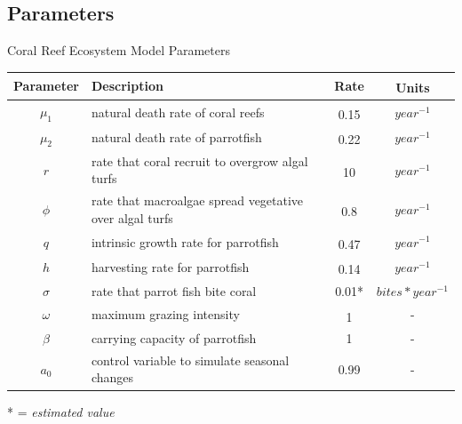 \documentclass{beamer}
\begin{document}
\subsection{Parameters}
\begin{frame}{Coral Reef Ecosystem Model Parameters}
\hspace{-7cm}
    \begin{table}
    \vspace{-1cm}
    \begin{tabular}{c p{5cm} c c}
        \hline
        Parameter & Description & Rate & Units\textsuperscript{\cite{12_noaa_report}\cite{04_mathanalysis}\cite{13_blackwood_hastings_mumby_2010}}\\
        \hline
        \hline
        $\mu_{1}$ & natural death rate of coral reefs & 0.15\textsuperscript{\cite{16_wolanski_richmond_mccook_2004}} & $year^{-1}$\\ %
        $\mu_{2}$ & natural death rate of parrotfish & 0.22\textsuperscript{\cite{12_noaa_report}} & $year^{-1}$\\ %
        $r$ & rate that coral recruit to overgrow algal turfs & 10\textsuperscript{\cite{16_wolanski_richmond_mccook_2004}} & $year^{-1}$\\ %
        $\phi$ & rate that macroalgae spread vegetative over algal turfs & 0.8\textsuperscript{\cite{11_zikkah_anggriani_supriatna_2020}} & $year^{-1}$\\ %
        $q$ & intrinsic growth rate for parrotfish & 0.47\textsuperscript{\cite{12_noaa_report}} & $year^{-1}$\\ %
        $h$ & harvesting rate for parrotfish & 0.14\textsuperscript{\cite{12_noaa_report}} & $year^{-1}$\\ %
        $\sigma$ & rate that parrot fish bite coral & 0.01*& $bites*year^{-1}$\\
        $\omega$ & maximum grazing intensity & 1\textsuperscript{\cite{13_blackwood_hastings_mumby_2010}} & -\\
        $\beta$ & carrying capacity of parrotfish & 1 & -\\
        $a_{0}$ & control variable to simulate seasonal changes & 0.99 & - %
    \end{tabular}
\end{table}
* = \textit{estimated value}
\end{frame}
\end{document}
